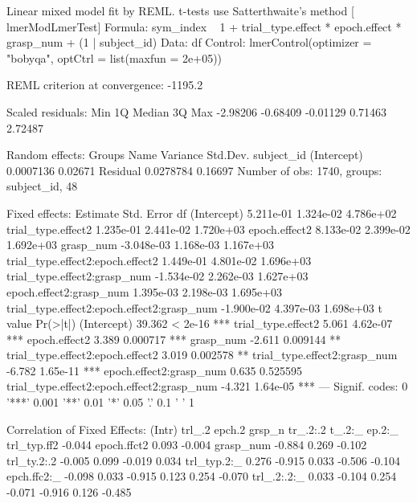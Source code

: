 Linear mixed model fit by REML. t-tests use Satterthwaite's method [
lmerModLmerTest]
Formula: sym_index ~ 1 + trial_type.effect * epoch.effect * grasp_num +  
    (1 | subject_id)
   Data: df
Control: lmerControl(optimizer = "bobyqa", optCtrl = list(maxfun = 2e+05))

REML criterion at convergence: -1195.2

Scaled residuals: 
     Min       1Q   Median       3Q      Max 
-2.98206 -0.68409 -0.01129  0.71463  2.72487 

Random effects:
 Groups     Name        Variance  Std.Dev.
 subject_id (Intercept) 0.0007136 0.02671 
 Residual               0.0278784 0.16697 
Number of obs: 1740, groups:  subject_id, 48

Fixed effects:
                                             Estimate Std. Error         df
(Intercept)                                 5.211e-01  1.324e-02  4.786e+02
trial_type.effect2                          1.235e-01  2.441e-02  1.720e+03
epoch.effect2                               8.133e-02  2.399e-02  1.692e+03
grasp_num                                  -3.048e-03  1.168e-03  1.167e+03
trial_type.effect2:epoch.effect2            1.449e-01  4.801e-02  1.696e+03
trial_type.effect2:grasp_num               -1.534e-02  2.262e-03  1.627e+03
epoch.effect2:grasp_num                     1.395e-03  2.198e-03  1.695e+03
trial_type.effect2:epoch.effect2:grasp_num -1.900e-02  4.397e-03  1.698e+03
                                           t value Pr(>|t|)    
(Intercept)                                 39.362  < 2e-16 ***
trial_type.effect2                           5.061 4.62e-07 ***
epoch.effect2                                3.389 0.000717 ***
grasp_num                                   -2.611 0.009144 ** 
trial_type.effect2:epoch.effect2             3.019 0.002578 ** 
trial_type.effect2:grasp_num                -6.782 1.65e-11 ***
epoch.effect2:grasp_num                      0.635 0.525595    
trial_type.effect2:epoch.effect2:grasp_num  -4.321 1.64e-05 ***
---
Signif. codes:  0 '***' 0.001 '**' 0.01 '*' 0.05 '.' 0.1 ' ' 1

Correlation of Fixed Effects:
            (Intr) trl_.2 epch.2 grsp_n tr_.2:.2 t_.2:_ ep.2:_
trl_typ.ff2 -0.044                                            
epoch.ffct2  0.093 -0.004                                     
grasp_num   -0.884  0.269 -0.102                              
trl_ty.2:.2 -0.005  0.099 -0.019  0.034                       
trl_typ.2:_  0.276 -0.915  0.033 -0.506 -0.104                
epch.ffc2:_ -0.098  0.033 -0.915  0.123  0.254   -0.070       
trl_.2:.2:_  0.033 -0.104  0.254 -0.071 -0.916    0.126 -0.485
 
